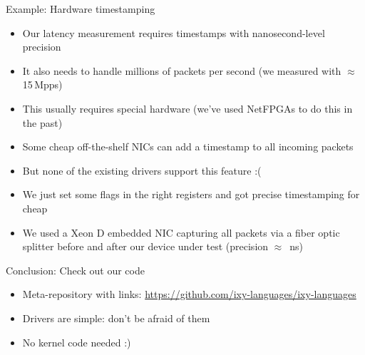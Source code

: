 \documentclass[NET,english,aspectratio=169,notitleframe]{tumbeamer}
\begin{document}
\begin{frame}{Example: Hardware timestamping}
\begin{itemize}
\item Our latency measurement requires timestamps with nanosecond-level precision
\item It also needs to handle millions of packets per second (we measured with $\approx$ 15\,Mpps)
\item This usually requires special hardware (we've used NetFPGAs to do this in the past)
\pause
\vspace{1em}
\item Some cheap off-the-shelf NICs can add a timestamp to all  incoming packets
\item But none of the existing drivers support this feature :(
\pause
\item We just set some flags in the right registers and got precise timestamping for cheap
\item We used a Xeon D embedded NIC capturing all packets via a fiber optic splitter before and after our device under test (precision $\approx$ \,ns)
\end{itemize}
\end{frame}


\begin{frame}{Conclusion: Check out our code}
\begin{itemize}
\item Meta-repository with links: \url{https://github.com/ixy-languages/ixy-languages}
\item Drivers are simple: don't be afraid of them
\item No kernel code needed :)
\end{itemize}
\end{frame}
\end{document}
